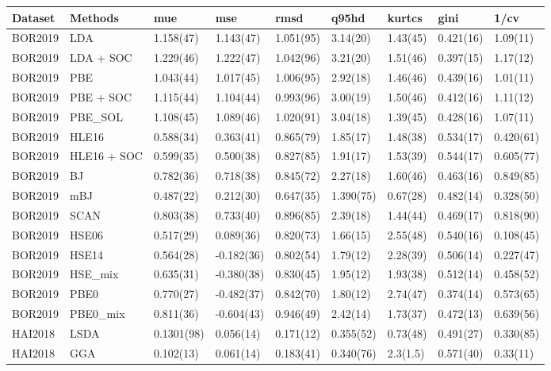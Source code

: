 \begin{table}[ht]
\centering
\begin{tabular}{lllllllll}
  \hline
Dataset & Methods & mue & mse & rmsd & q95hd & kurtcs & gini & 1/cv \\ 
  \hline
BOR2019 & LDA & 1.158(47) & 1.143(47) & 1.051(95) & 3.14(20) & 1.43(45) & 0.421(16) & 1.09(11) \\ 
  BOR2019 & LDA + SOC & 1.229(46) & 1.222(47) & 1.042(96) & 3.21(20) & 1.51(46) & 0.397(15) & 1.17(12) \\ 
  BOR2019 & PBE & 1.043(44) & 1.017(45) & 1.006(95) & 2.92(18) & 1.46(46) & 0.439(16) & 1.01(11) \\ 
  BOR2019 & PBE + SOC & 1.115(44) & 1.104(44) & 0.993(96) & 3.00(19) & 1.50(46) & 0.412(16) & 1.11(12) \\ 
  BOR2019 & PBE\_SOL & 1.108(45) & 1.089(46) & 1.020(91) & 3.04(18) & 1.39(45) & 0.428(16) & 1.07(11) \\ 
  BOR2019 & HLE16 & 0.588(34) & 0.363(41) & 0.865(79) & 1.85(17) & 1.48(38) & 0.534(17) & 0.420(61) \\ 
  BOR2019 & HLE16 + SOC & 0.599(35) & 0.500(38) & 0.827(85) & 1.91(17) & 1.53(39) & 0.544(17) & 0.605(77) \\ 
  BOR2019 & BJ & 0.782(36) & 0.718(38) & 0.845(72) & 2.27(18) & 1.60(46) & 0.463(16) & 0.849(85) \\ 
  BOR2019 & mBJ & 0.487(22) & 0.212(30) & 0.647(35) & 1.390(75) & 0.67(28) & 0.482(14) & 0.328(50) \\ 
  BOR2019 & SCAN & 0.803(38) & 0.733(40) & 0.896(85) & 2.39(18) & 1.44(44) & 0.469(17) & 0.818(90) \\ 
  BOR2019 & HSE06 & 0.517(29) & 0.089(36) & 0.820(73) & 1.66(15) & 2.55(48) & 0.540(16) & 0.108(45) \\ 
  BOR2019 & HSE14 & 0.564(28) & -0.182(36) & 0.802(54) & 1.79(12) & 2.28(39) & 0.506(14) & 0.227(47) \\ 
  BOR2019 & HSE\_mix & 0.635(31) & -0.380(38) & 0.830(45) & 1.95(12) & 1.93(38) & 0.512(14) & 0.458(52) \\ 
  BOR2019 & PBE0 & 0.770(27) & -0.482(37) & 0.842(70) & 1.80(12) & 2.74(47) & 0.374(14) & 0.573(65) \\ 
  BOR2019 & PBE0\_mix & 0.811(36) & -0.604(43) & 0.946(49) & 2.42(14) & 1.73(37) & 0.472(13) & 0.639(56) \\ 
  HAI2018 & LSDA & 0.1301(98) & 0.056(14) & 0.171(12) & 0.355(52) & 0.73(48) & 0.491(27) & 0.330(85) \\ 
  HAI2018 & GGA & 0.102(13) & 0.061(14) & 0.183(41) & 0.340(76) & 2.3(1.5) & 0.571(40) & 0.33(11) \\ 

\end{tabular}
\end{table}
